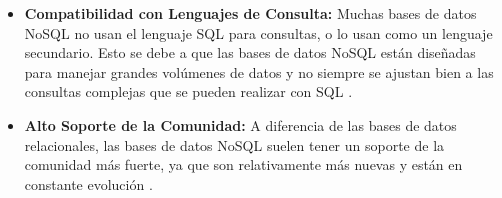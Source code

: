 \begin{itemize}
\item \textbf{Compatibilidad con Lenguajes de Consulta:} Muchas bases de datos NoSQL no usan el lenguaje SQL para consultas, o lo usan como un lenguaje secundario. Esto se debe a que las bases de datos NoSQL están diseñadas para manejar grandes volúmenes de datos y no siempre se ajustan bien a las consultas complejas que se pueden realizar con SQL \cite{nbase2}.

\item \textbf{Alto Soporte de la Comunidad:} A diferencia de las bases de datos relacionales, las bases de datos NoSQL suelen tener un soporte de la comunidad más fuerte, ya que son relativamente más nuevas y están en constante evolución \cite{nbase2}.
 
\end{itemize}

\newpage

\endinput 